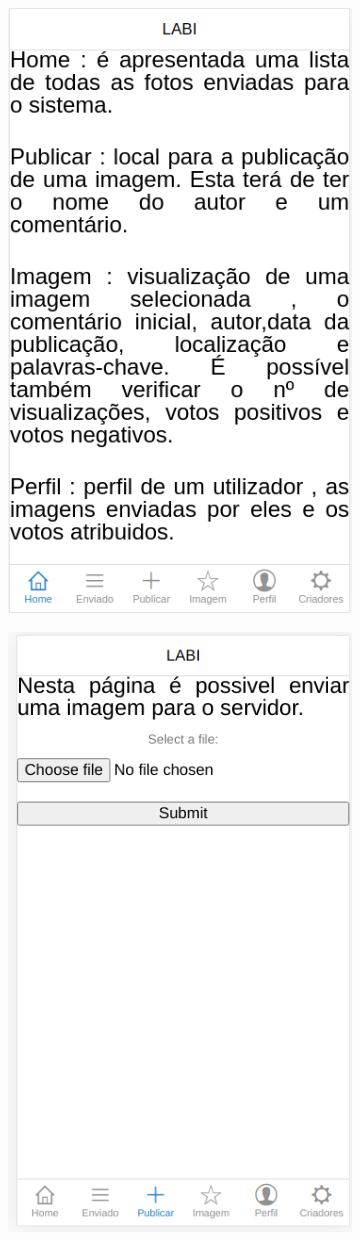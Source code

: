 \documentclass{report}
\begin{document}
\begin{figure}[hbt!]
\centering
\begin{subfigure}{.5\textwidth}
  \centering
  \includegraphics[width=0.6\linewidth]{home.png}
  \caption{}
\end{subfigure}%
\begin{subfigure}{.5\textwidth}
  \centering
  \includegraphics[width=0.6\linewidth]{publicar.png}

\end{subfigure}
\end{figure}
\end{document}
